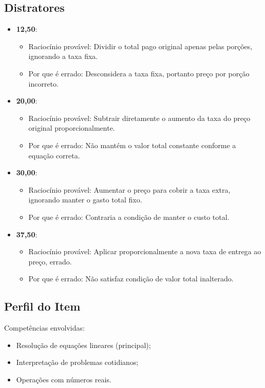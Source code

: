 \documentclass{article}
\begin{document}
\subsection*{Distratores}
\begin{itemize}
    \item \textbf{12,50}:
    \begin{itemize}
        \item Raciocínio provável: Dividir o total pago original apenas pelas porções, ignorando a taxa fixa.
        \item Por que é errado: Desconsidera a taxa fixa, portanto preço por porção incorreto.
    \end{itemize}
    \item \textbf{20,00}:
    \begin{itemize}
        \item Raciocínio provável: Subtrair diretamente o aumento da taxa do preço original proporcionalmente.
        \item Por que é errado: Não mantém o valor total constante conforme a equação correta.
    \end{itemize}
    \item \textbf{30,00}:
    \begin{itemize}
        \item Raciocínio provável: Aumentar o preço para cobrir a taxa extra, ignorando manter o gasto total fixo.
        \item Por que é errado: Contraria a condição de manter o custo total.
    \end{itemize}
    \item \textbf{37,50}:
    \begin{itemize}
        \item Raciocínio provável: Aplicar proporcionalmente a nova taxa de entrega ao preço, errado.
        \item Por que é errado: Não satisfaz condição de valor total inalterado.
    \end{itemize}
\end{itemize}

\subsection*{Perfil do Item}
Competências envolvidas:
\begin{itemize}
    \item Resolução de equações lineares (principal);
    \item Interpretação de problemas cotidianos;
    \item Operações com números reais.
\end{itemize}
\end{document}
